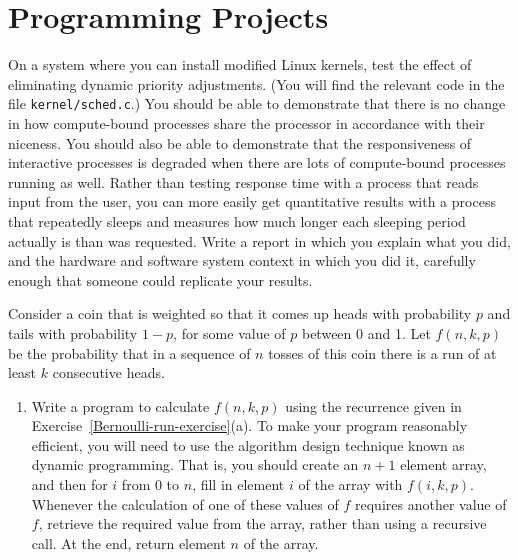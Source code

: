 \section*{Programming Projects}
\begin{chapterEnumerate}
\item
On a system where you can install modified Linux kernels, test the
effect of eliminating dynamic priority adjustments.  (You will find
the relevant code in the file \verb|kernel/sched.c|.)  You should be
able to demonstrate that there is no change in how compute-bound
processes share the processor in accordance with their niceness.  You
should also be able to demonstrate that the responsiveness of
interactive processes is degraded when there are lots of
compute-bound processes running as well.
Rather than testing response time with a process that reads input from
the user, you can more easily get quantitative results with a process
that repeatedly sleeps and measures how much longer 
each sleeping period actually is than was requested.
Write a report in which you explain what you did, and the hardware and
software system context in which you did it, carefully enough that
someone could replicate your results.
\item\label{Bernoulli-run-project}
Consider a coin that is weighted so that it comes up heads with
probability $p$ and tails with probability $1-p$, for some value of
$p$ between 0 and 1.  Let $f(n,k,p)$ be the probability that in a
sequence of $n$ tosses of this coin there is a run of at least $k$
consecutive heads.
\begin{enumerate}
\item
Write a program to calculate $f(n,k,p)$ using the recurrence
given in Exercise~\ref{Bernoulli-run-exercise}(a).
To make your program reasonably efficient, you will need to use
the algorithm design technique known as dynamic programming.  That is,
you should create an $n+1$ element array, and then for $i$ from 0 to
$n$, fill in element $i$ of the array with $f(i,k,p)$.  Whenever the
calculation of one of these values of $f$ requires another value of
$f$, retrieve the required value from the array, rather than using a
recursive call.  At the end, return element $n$ of the array.

\end{enumerate}
\end{chapterEnumerate}
